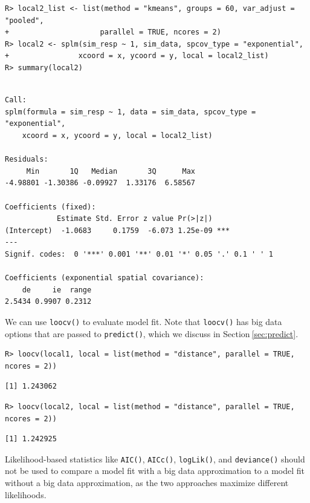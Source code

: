 \documentclass{article}
\begin{document}
\begin{verbatim}
R> local2_list <- list(method = "kmeans", groups = 60, var_adjust = "pooled",
+                     parallel = TRUE, ncores = 2)
R> local2 <- splm(sim_resp ~ 1, sim_data, spcov_type = "exponential", 
+                xcoord = x, ycoord = y, local = local2_list)
R> summary(local2)
\end{verbatim}

\begin{verbatim}

Call:
splm(formula = sim_resp ~ 1, data = sim_data, spcov_type = "exponential", 
    xcoord = x, ycoord = y, local = local2_list)

Residuals:
     Min       1Q   Median       3Q      Max 
-4.98801 -1.30386 -0.09927  1.33176  6.58567 

Coefficients (fixed):
            Estimate Std. Error z value Pr(>|z|)    
(Intercept)  -1.0683     0.1759  -6.073 1.25e-09 ***
---
Signif. codes:  0 '***' 0.001 '**' 0.01 '*' 0.05 '.' 0.1 ' ' 1

Coefficients (exponential spatial covariance):
    de     ie  range 
2.5434 0.9907 0.2312 
\end{verbatim}

We can use \texttt{loocv()} to evaluate model fit. Note that
\texttt{loocv()} has big data options that are passed to
\texttt{predict()}, which we discuss in Section\(~\)\ref{sec:predict}.

\begin{verbatim}
R> loocv(local1, local = list(method = "distance", parallel = TRUE, ncores = 2))
\end{verbatim}

\begin{verbatim}
[1] 1.243062
\end{verbatim}

\begin{verbatim}
R> loocv(local2, local = list(method = "distance", parallel = TRUE, ncores = 2))
\end{verbatim}

\begin{verbatim}
[1] 1.242925
\end{verbatim}

Likelihood-based statistics like \texttt{AIC()}, \texttt{AICc()},
\texttt{logLik()}, and \texttt{deviance()} should not be used to compare
a model fit with a big data approximation to a model fit without a big
data approximation, as the two approaches maximize different
likelihoods.
\end{document}
